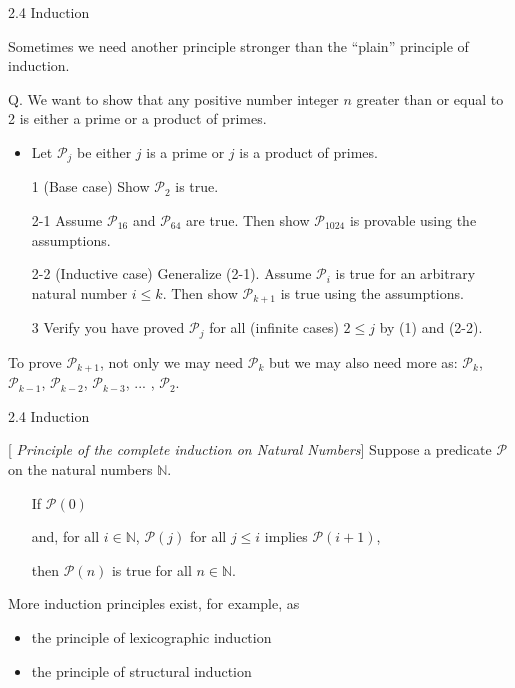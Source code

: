 \documentclass[table]{beamer}
\begin{document}
\begin{frame}[t]{2.4 Induction}

Sometimes we need another principle stronger than the ``plain'' principle of induction. 

\vspace{10pt}

Q. We want to show that any positive number integer $n$ greater than or equal to 2 is either a prime or a product of primes.

\begin{itemize}
\item Let $\mathcal{P}_j$ be either $j$ is a prime or $j$ is a product of primes.
\item[1] (Base case) Show $\mathcal{P}_2$ is true.
\item[2-1] Assume $\mathcal{P}_{16}$ and $\mathcal{P}_{64}$ are true. Then show $\mathcal{P}_{1024}$ is provable using the assumptions.
\item[2-2] (Inductive case) Generalize (2-1). Assume $\mathcal{P}_i$ is true for an arbitrary natural number $i\leq k$. Then show $\mathcal{P}_{k+1}$ is true using the assumptions.
\item[3] Verify you have proved $\mathcal{P}_j$ for all (infinite cases) $2\leq j$ by (1) and (2-2).
\end{itemize}

\vspace{10pt}

To prove $\mathcal{P}_{k+1}$, not only we may need $\mathcal{P}_{k}$ but we may also need more as: $\mathcal{P}_k$, $\mathcal{P}_{k-1}$, $\mathcal{P}_{k-2}$, $\mathcal{P}_{k-3}$, ... , $\mathcal{P}_{2}$.

\end{frame}

\begin{frame}[t]{2.4 Induction} \vspace{10pt}

[{\it \color{red} Principle of the complete induction on Natural Numbers}]
Suppose a predicate $\mathcal{P}$ on the natural numbers $\mathbb{N}$. 
\begin{itemize}
\item[] If $\mathcal{P}(0)$
\item[] and, for all $i\in \mathbb{N}$, {\color{red} $\mathcal{P}(j)$ for all $j\leq i$} implies $\mathcal{P}(i+1)$,
\item[] then $\mathcal{P}(n)$ is true for all $n \in \mathbb{N}$.
\end{itemize}

\vspace{10pt}

More induction principles exist, for example, as
\begin{itemize}
\item the principle of lexicographic induction 
\item the principle of structural induction
\end{itemize}

\end{frame}
\end{document}
